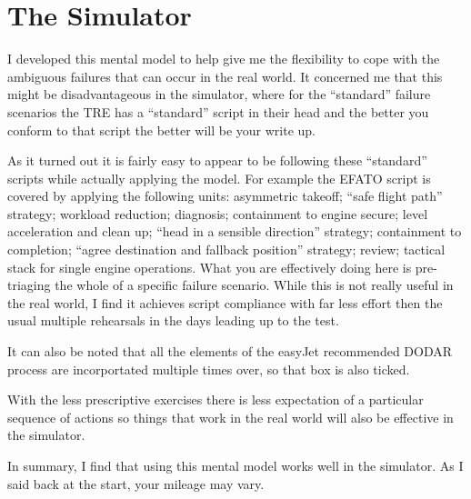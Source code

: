 \documentclass[a5paper,11pt,titlepage]{article}
\begin{document}
\section{The Simulator}

I developed this mental model to help give me the flexibility to cope
with the ambiguous failures that can occur in the real world. It
concerned me that this might be disadvantageous in the simulator, where
for the ``standard'' failure scenarios the TRE has a ``standard'' script
in their head and the better you conform to that script the better will
be your write up.

As it turned out it is fairly easy to appear to be following these
``standard'' scripts while actually applying the model. For example the
EFATO script is covered by applying the following units: asymmetric
takeoff; ``safe flight path'' strategy; workload reduction; diagnosis;
containment to engine secure; level acceleration and clean up; ``head in
a sensible direction'' strategy; containment to completion; ``agree
destination and fallback position'' strategy; review; tactical stack for
single engine operations. What you are effectively doing here is
pre-triaging the whole of a specific failure scenario. While this is not
really useful in the real world, I find it achieves script compliance
with far less effort then the usual multiple rehearsals in the days
leading up to the test.

It can also be noted that all the elements of the easyJet recommended
DODAR process are incorportated multiple times over, so that box is also
ticked.

With the less prescriptive exercises there is less expectation of a
particular sequence of actions so things that work in the real world
will also be effective in the simulator.

In summary, I find that using this mental model works well in the
simulator. As I said back at the start, your mileage may vary.
\end{document}
